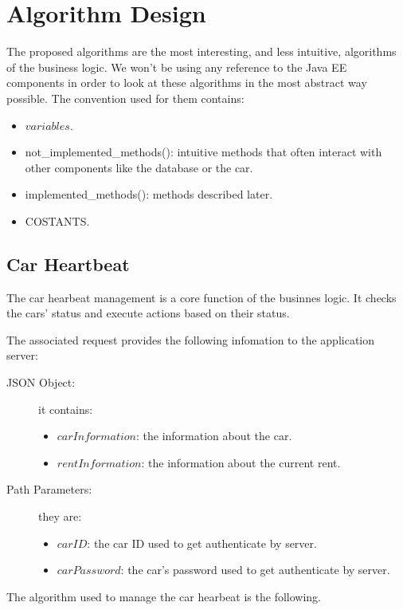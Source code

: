 \section{Algorithm Design} \label{sec algorithm design}

The proposed algorithms are the most interesting, and less intuitive, algorithms of the business logic. We won't be using any reference to the Java EE components in order to look at these algorithms in the most abstract way possible. 
The convention used for them contains:
 \begin{itemize}
	\item $variables$.
	\item {\color{blue}not\_implemented\_methods()}: intuitive methods that often interact with other components like the database or the car.
	\item {\color{green}implemented\_methods()}: methods described later.
	\item {\color{red} COSTANTS}.
\end{itemize}

\subsection{Car Heartbeat}

The car hearbeat management is a core function of the businnes logic. It checks the cars' status and execute actions based on their status.
 
The associated request provides the following infomation to the application server:
\begin{description}
\item [JSON Object:] it contains:
	\begin{itemize}
		\item $carInformation$: the information about the car.
		\item $rentInformation$: the information about the current rent.
	\end{itemize}
\item [Path Parameters:] they are:
	\begin{itemize}
		\item $carID$: the car ID used to get authenticate by server.
		\item $carPassword$: the car's password used to get authenticate by server.
	\end{itemize}
\end{description}
The algorithm used to manage the car hearbeat is the following.

